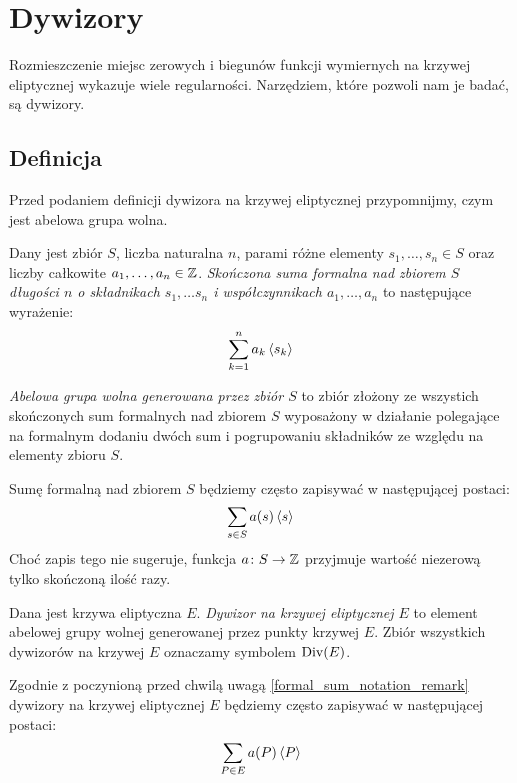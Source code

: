 \section{Dywizory}

Rozmieszczenie miejsc zerowych i biegunów
funkcji wymiernych na krzywej eliptycznej
wykazuje wiele regularności.
Narzędziem, które pozwoli nam je badać, są dywizory.

\subsection*{Definicja}

Przed podaniem definicji dywizora na krzywej eliptycznej przypomnijmy,
czym jest abelowa grupa wolna.

\begin{definition}
Dany jest zbiór $S$,
liczba naturalna $n$,
parami różne elementy $s_1, \ldots, s_n \in S$
oraz liczby całkowite $a_1, \ldots, a_n \in \mathbb{Z}$.
\emph{Skończona suma formalna nad zbiorem $S$ długości $n$
o składnikach $s_1, \ldots s_n$ i współczynnikach $a_1, \ldots, a_n$}
to następujące wyrażenie:
\begin{equation*}
\sum_{k=1}^n a_k\left\langle s_k\right\rangle
\end{equation*}

\emph{Abelowa grupa wolna generowana przez zbiór $S$}
to zbiór złożony ze wszystich skończonych sum formalnych nad zbiorem $S$
wyposażony w działanie polegające na formalnym dodaniu dwóch sum
i pogrupowaniu składników ze względu na elementy zbioru $S$.
\end{definition}

\begin{remark}\label{formal_sum_notation_remark}
Sumę formalną nad zbiorem $S$ będziemy często zapisywać
w następującej postaci:
\begin{equation*}
\sum_{s \in S}a(s)\left\langle s\right\rangle
\end{equation*}
Choć zapis tego nie sugeruje,
funkcja $a \colon S \to \mathbb{Z}$ przyjmuje wartość niezerową
tylko skończoną ilość razy.
\end{remark}

\begin{definition}
Dana jest krzywa eliptyczna $E$.
\emph{Dywizor na krzywej eliptycznej $E$}
to element abelowej grupy wolnej generowanej przez punkty krzywej $E$.
Zbiór wszystkich dywizorów na krzywej $E$ oznaczamy symbolem $\operatorname{Div}(E)$.
\end{definition}

\begin{remark}
Zgodnie z poczynioną przed chwilą uwagą \ref{formal_sum_notation_remark}
dywizory na krzywej eliptycznej $E$ będziemy często zapisywać
w następującej postaci:
\begin{equation*}
\sum_{P \in E} a(P)\left\langle P\right\rangle
\end{equation*}
\end{remark}

